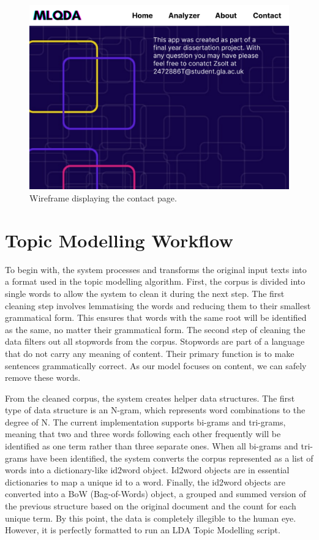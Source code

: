 \documentclass{l4proj}
\begin{document}
\begin{appendices}
\begin{figure}[H]
\centering
    \includegraphics[width=0.95\linewidth]{images/Contact.png}
    \caption{Wireframe displaying the contact page.}
    \label{fig:wireframes_contact} 
\end{figure}

\chapter{Topic Modelling Workflow}
\label{appendix:tm_workflow}
To begin with, the system processes and transforms the original input texts into a format used in the topic modelling algorithm. First, the corpus is divided into single words to allow the system to clean it during the next step. The first cleaning step involves lemmatising the words and reducing them to their smallest grammatical form. This ensures that words with the same root will be identified as the same, no matter their grammatical form. The second step of cleaning the data filters out all stopwords from the corpus. Stopwords are part of a language that do not carry any meaning of content. Their primary function is to make sentences grammatically correct. As our model focuses on content, we can safely remove these words.

From the cleaned corpus, the system creates helper data structures. The first type of data structure is an N-gram, which represents word combinations to the degree of N. The current implementation supports bi-grams and tri-grams, meaning that two and three words following each other frequently will be identified as one term rather than three separate ones. When all bi-grams and tri-grams have been identified, the system converts the corpus represented as a list of words into a dictionary-like id2word object. Id2word objects are in essential dictionaries to map a unique id to a word. Finally, the id2word objects are converted into a BoW (Bag-of-Words) object, a grouped and summed version of the previous structure based on the original document and the count for each unique term. By this point, the data is completely illegible to the human eye. However, it is perfectly formatted to run an LDA Topic Modelling script.


\end{appendices}
\end{document}
